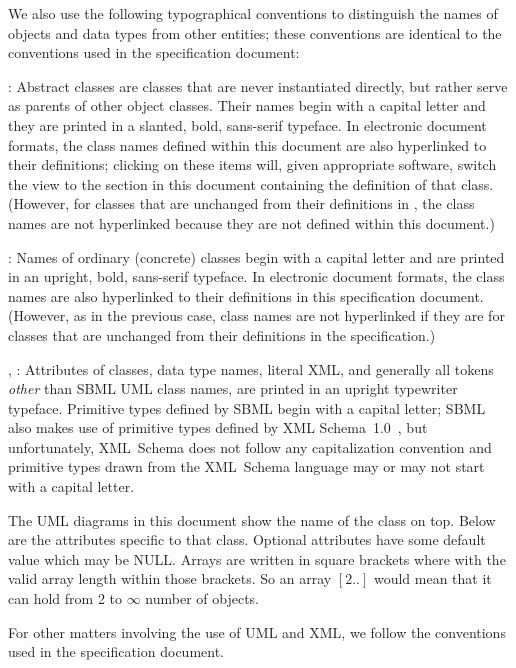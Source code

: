 We also use the following typographical conventions to distinguish the
names of objects and data types from other entities; these conventions
are identical to the conventions used in the \sbmlthreecore specification
document:

\begin{description}

\item {}: Abstract classes are classes that
  are never instantiated directly, but rather serve as parents of other
  object classes.  Their names begin with a capital letter and they are
  printed in a slanted, bold, sans-serif typeface.  In electronic
  document formats, the class names defined within this document are
  also hyperlinked to their definitions; clicking
  on these items will, given appropriate software, switch the view to
  the section in this document containing the definition of that class.
  (However, for classes that are unchanged from their definitions in
  \sbmlthreecore, the class names are not hyperlinked because they
  are not defined within this document.)

\item {}: Names of ordinary (concrete) classes begin with a
  capital letter and are printed in an upright, bold, sans-serif
  typeface.  In electronic document formats, the class names are also
  hyperlinked to their definitions in this specification document.
  (However, as in the previous case, class names are not hyperlinked if
  they are for classes that are unchanged from their definitions in the
  \sbmlthreecore specification.)

\item {}, : Attributes of classes, data
  type names, literal XML, and generally all tokens \emph{other} than
  SBML UML class names, are printed in an upright typewriter typeface.
  Primitive types defined by SBML begin with a capital letter; SBML also
  makes use of primitive types defined by XML
  Schema~1.0~\citep{biron:2000,fallside:2000,thompson:2000}, but
  unfortunately, XML~Schema does not follow any capitalization
  convention and primitive types drawn from the XML~Schema language may
  or may not start with a capital letter.

\end{description}

The UML diagrams in this document show the name of the class on top. Below are the attributes specific to that class. Optional attributes have some default value which may be NULL. Arrays are written in square brackets where with the valid array length within those brackets. So an array $[2..]$ would mean that it can hold from 2 to $\infty$ number of objects.

For other matters involving the use of UML and XML, we follow the
conventions used in the \sbmlthreecore specification document.

